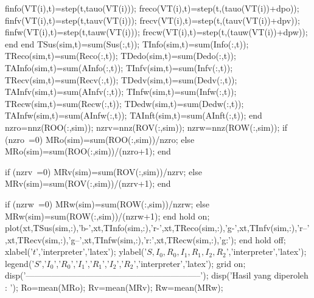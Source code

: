                                           finfo(VT(i),t)=step(t,tauo(VT(i))); %
                                          freco(VT(i),t)=step(t,(tauo(VT(i))+dpo)); %
                                          finfv(VT(i),t)=step(t,tauv(VT(i))); %
                                          frecv(VT(i),t)=step(t,(tauv(VT(i))+dpv)); %
                                          finfw(VT(i),t)=step(t,tauw(VT(i))); %
                                          frecw(VT(i),t)=step(t,(tauw(VT(i))+dpw)); %
                                    end
                          end                                            
              TSus(sim,t)=sum(Sus(:,t));
              TInfo(sim,t)=sum(Info(:,t));
              TReco(sim,t)=sum(Reco(:,t));
              TDedo(sim,t)=sum(Dedo(:,t));
              TAInfo(sim,t)=sum(AInfo(:,t));                        
              TInfv(sim,t)=sum(Infv(:,t));
              TRecv(sim,t)=sum(Recv(:,t));
              TDedv(sim,t)=sum(Dedv(:,t));
              TAInfv(sim,t)=sum(AInfv(:,t));  
              TInfw(sim,t)=sum(Infw(:,t));
              TRecw(sim,t)=sum(Recw(:,t));
              TDedw(sim,t)=sum(Dedw(:,t));
              TAInfw(sim,t)=sum(AInfw(:,t));  
              TAInft(sim,t)=sum(AInft(:,t));             
              end             
            nzro=nnz(ROO(:,sim));
            nzrv=nnz(ROV(:,sim));
            nzrw=nnz(ROW(:,sim));
            if (nzro~=0)
                MRo(sim)=sum(ROO(:,sim))/nzro;
            else 
                MRo(sim)=sum(ROO(:,sim))/(nzro+1);
            end
            
            if (nzrv~=0)
                MRv(sim)=sum(ROV(:,sim))/nzrv;
            else 
                MRv(sim)=sum(ROV(:,sim))/(nzrv+1);
            end
            
            if (nzrw~=0)
                MRw(sim)=sum(ROW(:,sim))/nzrw;
            else 
                MRw(sim)=sum(ROW(:,sim))/(nzrw+1);
            end          
hold on;
plot(xt,TSus(sim,:),'b-',xt,TInfo(sim,:),'r-',xt,TReco(sim,:),'g-',xt,TInfv(sim,:),'r--',xt,TRecv(sim,:),'g--',xt,TInfw(sim,:),'r:',xt,TRecw(sim,:),'g:');%
end
hold off;
xlabel('$t$','interpreter','latex');
ylabel('$S,I_{0}, R_{0}, I_{1}, R_{1},I_{2}, R_{2}$','interpreter','latex');
legend('$S$','$I_{0}$','$R_{0}$','$I_{1}$','$R_{1}$','$I_{2}$','$R_{2}$','interpreter','latex');
grid on;
        disp('--------------------------------------------------------------');
        disp('Hasil yang diperoleh : ');
        Ro=mean(MRo);
        Rv=mean(MRv);
        Rw=mean(MRw);
        
